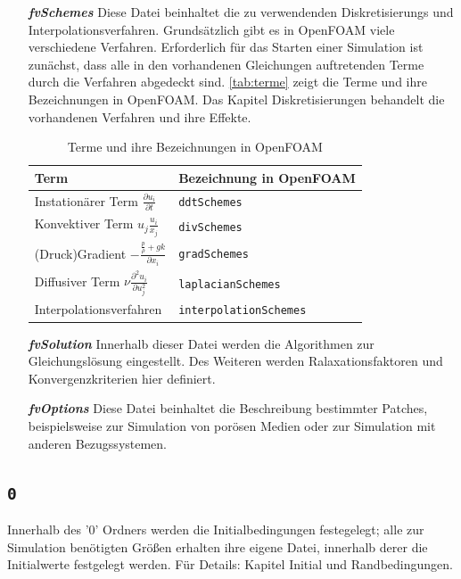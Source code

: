 \begin{itemize}
	\item[\textbf{\textit{fvSchemes}}] Diese Datei beinhaltet die zu verwendenden Diskretisierungs und Interpolationsverfahren. Grundsätzlich gibt es in OpenFOAM viele verschiedene Verfahren. Erforderlich für das Starten einer Simulation ist zunächst, dass alle in den vorhandenen Gleichungen auftretenden Terme durch die Verfahren abgedeckt sind. \autoref{tab:terme} zeigt die Terme und ihre Bezeichnungen in OpenFOAM. Das Kapitel Diskretisierungen behandelt die vorhandenen Verfahren und ihre Effekte.
	
	\begin{table}[htb]
	  \centering
	  \begin{tabular}{m{6cm}m{3cm}} 
	  \toprule
	    	Term & Bezeichnung in OpenFOAM \\
	  \midrule
			Instationärer Term $ \frac{\partial u_{i}}{\partial t} $ & \texttt{ddtSchemes} \\
			Konvektiver Term $ u_{j} \frac{u_{i}}{x_{j}} $ & \texttt{divSchemes} \\
			(Druck)Gradient $ - \frac{ \frac{p}{\rho} + g k}{\partial x_{i}} $ & \texttt{gradSchemes} \\
			Diffusiver Term $ \nu \frac{\partial^{2} u_{i}}{\partial u_{j}^{2}} $& \texttt{laplacianSchemes} \\
			Interpolationsverfahren & \texttt{interpolationSchemes} \\
	  \bottomrule
	  
	  \end{tabular}
	  \caption[Terme und ihre Bezeichnungen in OpenFOAM]{Terme und ihre Bezeichnungen in OpenFOAM}
	  \label{tab:terme}
	\end{table} 
	
	\item[\textbf{\textit{fvSolution}}] Innerhalb dieser Datei werden die Algorithmen zur Gleichungslösung eingestellt. Des Weiteren werden Ralaxationsfaktoren und Konvergenzkriterien hier definiert. 
	
	\item[\textbf{\textit{fvOptions}}] Diese Datei beinhaltet die Beschreibung bestimmter Patches, beispielsweise zur Simulation von porösen Medien oder zur Simulation mit anderen Bezugssystemen. 
	
\end{itemize}

\subsection{\texttt{0}}
Innerhalb des '0' Ordners werden die Initialbedingungen festegelegt; alle zur Simulation benötigten Größen erhalten ihre eigene Datei, innerhalb derer die Initialwerte festgelegt werden. Für Details: Kapitel Initial und Randbedingungen. 




\newpage